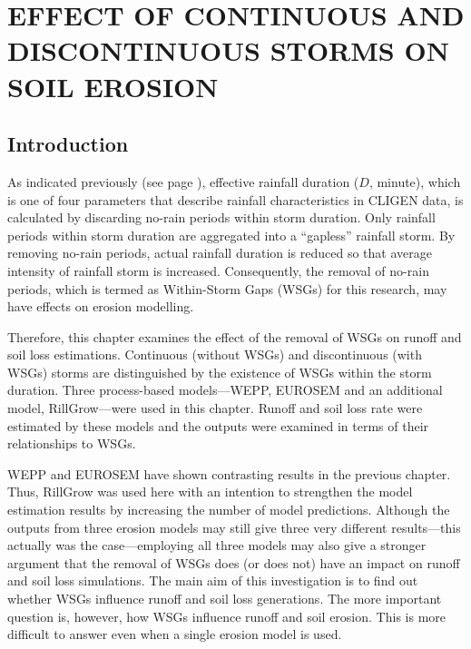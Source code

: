 \chapter{EFFECT OF CONTINUOUS AND DISCONTINUOUS STORMS ON SOIL EROSION}
\label{sec:EFFECTSOFCONTINOUSANDDISCONTINUSSTORM}

\section{Introduction}
\label{sec:ContinousAndDiscontinousStormIntroduction}

As indicated previously (see page \pageref{sec:ClimateGeneratorCLIGEN}),
effective rainfall duration ($D$, minute), which
is one of four parameters that describe rainfall characteristics in CLIGEN
data, is calculated by discarding no-rain periods within storm duration. Only
rainfall periods within storm duration are aggregated into a ``gapless''
rainfall storm. By removing no-rain periods, actual rainfall duration is
reduced so that average intensity of rainfall storm is increased. Consequently,
the removal of no-rain periods, which is termed as Within-Storm Gaps (WSGs) for
this research, may have effects on erosion modelling.

Therefore, this chapter examines the effect of the removal of WSGs on
runoff and soil loss estimations. Continuous (without WSGs) and discontinuous
(with WSGs) storms are distinguished by the existence of WSGs within the storm
duration. Three process-based models---WEPP, EUROSEM and an additional model,
RillGrow---were used in this chapter. Runoff and soil loss rate were estimated
by these models and the outputs were examined in terms of their relationships to
WSGs.

WEPP and EUROSEM have shown contrasting results in the previous chapter. Thus,
RillGrow was used here with an intention to strengthen the model estimation
results by increasing the number of model predictions. Although the outputs from
three erosion models may still give three very different results---this actually
was the case---employing all three models may also give a stronger argument that
the removal of WSGs does (or does not) have an impact on runoff and soil loss
simulations.
The main aim of this investigation is to find out whether WSGs influence runoff
and soil loss generations. The more important question is, however, how WSGs
influence runoff and soil erosion. This is more difficult to answer even when a
single erosion model is used.

